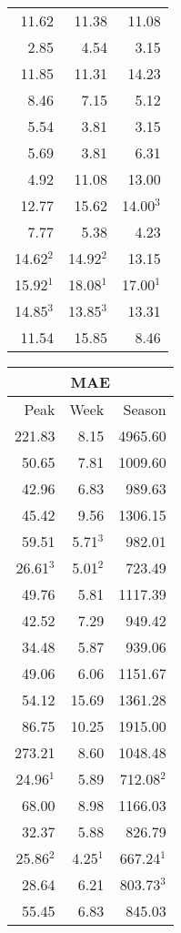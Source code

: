 \documentclass[12pt]{article}
\begin{document}
\begin{table}[ht!]
\begin{minipage}{4.5cm}
\begin{tabular}{rrr}
  11.62 & 11.38 & 11.08 \\ 
  2.85 & 4.54 & 3.15 \\ 
  11.85 & 11.31 & 14.23 \\ 
  8.46 & 7.15 & 5.12 \\ 
  5.54 & 3.81 & 3.15 \\ 
  5.69 & 3.81 & 6.31 \\ 
  4.92 & 11.08 & 13.00 \\ 
  12.77 & 15.62 & 14.00$^3$ \\ 
  7.77 & 5.38 & 4.23 \\ 
  14.62$^2$ & 14.92$^2$ & 13.15 \\ 
  15.92$^1$ & 18.08$^1$ & 17.00$^1$ \\ 
  14.85$^3$ & 13.85$^3$ & 13.31 \\ 
  11.54 & 15.85 & 8.46 \\ 
   \hline
\end{tabular}
\end{minipage}
\hfill
\begin{minipage}{4.5cm}
\begin{tabular}{rrr}
 \multicolumn{3}{c}{MAE} \\
  \hline
 Peak & Week & Season \\ 
  \hline
  221.83 & 8.15 & 4965.60 \\ 
  50.65 & 7.81 & 1009.60 \\ 
  42.96 & 6.83 & 989.63 \\ 
  45.42 & 9.56 & 1306.15 \\ 
  59.51 & 5.71$^3$ & 982.01 \\ 
  26.61$^3$ & 5.01$^2$ & 723.49 \\ 
  49.76 & 5.81 & 1117.39 \\ 
  42.52 & 7.29 & 949.42 \\ 
  34.48 & 5.87 & 939.06 \\ 
  49.06 & 6.06 & 1151.67 \\ 
  54.12 & 15.69 & 1361.28 \\ 
  86.75 & 10.25 & 1915.00 \\ 
  273.21 & 8.60 & 1048.48 \\ 
  24.96$^1$ & 5.89 & 712.08$^2$ \\ 
  68.00 & 8.98 & 1166.03 \\ 
  32.37 & 5.88 & 826.79 \\ 
  25.86$^2$& 4.25$^1$ & 667.24$^1$ \\ 
  28.64 & 6.21 & 803.73$^3$ \\ 
  55.45 & 6.83 & 845.03 \\ 

\end{tabular}
\end{minipage}
\end{table}
\end{document}
